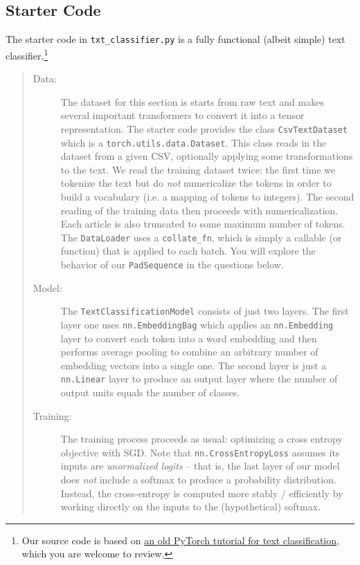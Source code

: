 \documentclass[11pt,addpoints,answers]{exam}
\begin{document}
\begin{questions}
\subsection*{Starter Code}

The starter code in \lstinline{txt_classifier.py} is a fully functional (albeit simple) text classifier.\footnote{Our source code is based on \href{https://web.archive.org/web/20240327115802/https://pytorch.org/tutorials/beginner/text_sentiment_ngrams_tutorial.html}{an old PyTorch tutorial for text classification}, which you are welcome to review.}

\begin{quote}
\begin{description}

\item[Data:] The dataset for this section is starts from raw text and makes several important transformers to convert it into a tensor representation. The starter code provides the class \lstinline{CsvTextDataset} which is a \lstinline{torch.utils.data.Dataset}. This class reads in the dataset from a given CSV, optionally applying some transformations to the text. 
%
We read the training dataset twice: the first time we tokenize the text but do \emph{not} numericalize the tokens in order to build a vocabulary (i.e. a mapping of tokens to integers). The second reading of the training data then proceeds with numericalization. Each article is also truncated to some maximum number of tokens.
%
The \lstinline{DataLoader} uses a \lstinline{collate_fn}, which is simply a callable (or function) that is applied to each batch. You will explore the behavior of our \lstinline{PadSequence} in the questions below.

\item[Model:] The \lstinline{TextClassificationModel} consists of just two layers. The first layer one uses \lstinline{nn.EmbeddingBag} which applies an \lstinline{nn.Embedding} layer to convert each token into a word embedding and then performs average pooling to combine an arbitrary number of embedding vectors into a single one. The second layer is just a \lstinline{nn.Linear} layer to produce an output layer where the number of output units equals the number of classes.

\item[Training:] The training process proceeds as usual: optimizing a cross entropy objective with SGD. Note that \lstinline{nn.CrossEntropyLoss} assumes its inputs are \emph{unormalized logits} -- that is, the last layer of our model does \emph{not} include a softmax to produce a probability distribution. Instead, the cross-entropy is computed more stably / efficiently by working directly on the inputs to the (hypothetical) softmax.


\end{description}
\end{quote}
\end{questions}
\end{document}
